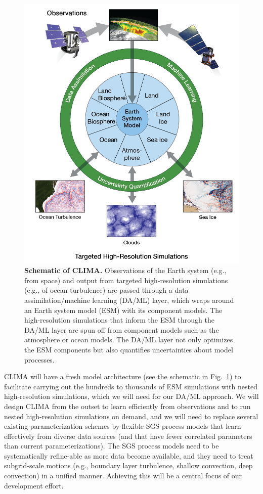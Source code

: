 \documentclass{article}
\begin{document}
\begin{figure}
\centerline{\includegraphics[width=.95\textwidth]{CLIMA-schematic.png}}
\caption{\textbf{Schematic of CLIMA.} Observations of the Earth system (e.g., from space) and output from targeted high-resolution simulations (e.g., of ocean turbulence) are passed through a data assimilation/machine learning (DA/ML) layer, which wraps around an Earth system model (ESM) with its component models. The high-resolution simulations that inform the ESM through the DA/ML layer are spun off from component models such as the atmosphere or ocean models. The DA/ML layer not only optimizes the ESM components but also quantifies uncertainties about model processes.} 
\label{f:CLIMA-schematic}
\end{figure}
CLIMA will have a fresh model architecture (see the schematic in Fig.~\ref{f:CLIMA-schematic}) to facilitate carrying out the hundreds to thousands of ESM simulations with nested high-resolution simulations, which we will need for our DA/ML approach. We will design CLIMA from the outset to learn efficiently from observations and to run nested high-resolution simulations on demand, and we will need to replace several existing parameterization schemes by flexible SGS process models that learn effectively from diverse data sources (and that have fewer correlated parameters than current parameterizations). The SGS process models need to be systematically refine-able as more data become available, and they need to treat subgrid-scale motions (e.g., boundary layer turbulence, shallow convection, deep convection) in a unified manner. Achieving this will be a central focus of our development effort.
\end{document}
